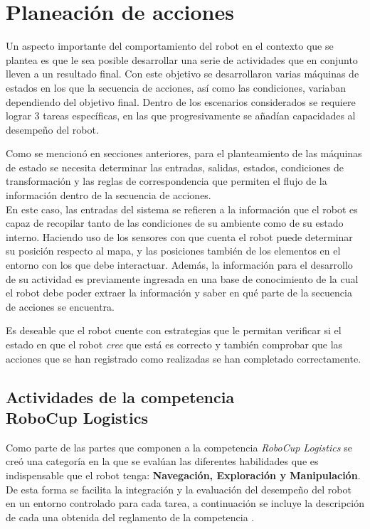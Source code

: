 \chapter{Planeación de acciones}
Un aspecto importante del comportamiento del robot en el contexto que se plantea es que le sea posible desarrollar una serie de actividades que en conjunto lleven a un resultado final.
Con este objetivo se desarrollaron varias máquinas de estados en los que la secuencia de acciones, así como las condiciones, variaban dependiendo del objetivo final. 
Dentro de los escenarios considerados se requiere lograr 3 tareas específicas, en las que progresivamente se añadían capacidades al desempeño del robot.

Como se mencionó en secciones anteriores, para el planteamiento de las máquinas de estado se necesita determinar las entradas, salidas, estados,  condiciones de transformación y las reglas de correspondencia que permiten el flujo de la información dentro de la secuencia de acciones.\\
En este caso, las entradas del sistema se refieren a la información que el robot es capaz de recopilar tanto de las condiciones de su ambiente como de su estado interno.
Haciendo uso de los sensores con que cuenta el robot puede determinar su posición respecto al mapa, y las posiciones también de los elementos en el entorno con los que debe interactuar.
Además, la información para el desarrollo de su actividad es previamente ingresada en una base de conocimiento de la cual el robot debe poder extraer la información y saber en qué parte de la secuencia de acciones se encuentra.

Es deseable que el robot cuente con estrategias que le permitan verificar si el estado en que el robot \textit{cree} que está es correcto y también comprobar que las acciones que se han registrado como realizadas se han completado correctamente.

\section{Actividades de la competencia \\RoboCup Logistics}
Como parte de las partes que componen a la competencia \textit{RoboCup Logistics} se creó una categoría en la que se evalúan las diferentes habilidades que es indispensable que el robot tenga: \textbf{Navegación, Exploración y Manipulación}. De esta forma se facilita la integración y la evaluación del desempeño del robot en un entorno controlado para cada tarea, a continuación se incluye la descripción de cada una obtenida del reglamento de la competencia \cite{technical_committee_20122022_robocup_2022}.

